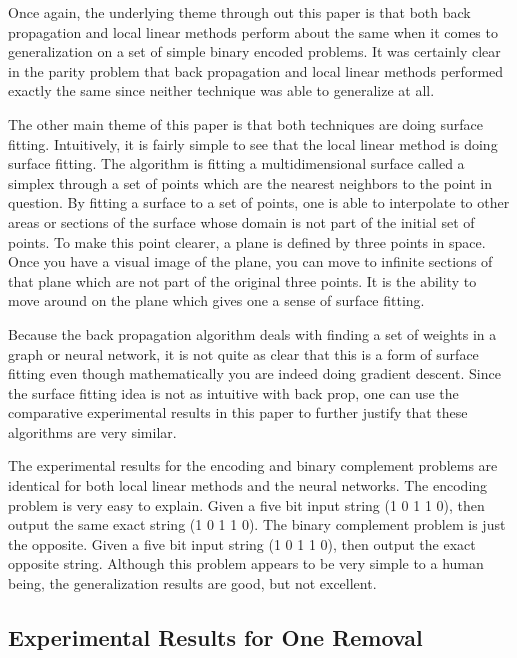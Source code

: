 	Once again, the underlying theme through out this paper is
that both back propagation and local linear methods perform about the
same when it comes to generalization on a set of simple binary encoded
problems.  It was certainly clear in the parity problem that back
propagation and local linear methods performed exactly the same since
neither technique was able to generalize at all.

	The other main theme of this paper is that both techniques are
doing surface fitting.  Intuitively, it is fairly simple to see that
the local linear method is doing surface fitting.  The algorithm is
fitting a multidimensional surface called a simplex through a set of
points which are the nearest neighbors to the point in question.  By
fitting a surface to a set of points, one is able to interpolate to
other areas or sections of the surface whose domain is not part of the
initial set of points.  To make this point clearer, a plane is defined
by three points in space.  Once you have a visual image of the plane,
you can move to infinite sections of that plane which are not part of
the original three points.  It is the ability to move around on the
plane which gives one a sense of surface fitting.

	Because the back propagation algorithm deals with finding a
set of weights in a graph or neural network, it is not quite as clear
that this is a form of surface fitting even though mathematically you
are indeed doing gradient descent.  Since the surface fitting idea is
not as intuitive with back prop, one can use the comparative
experimental results in this paper to further justify that these
algorithms are very similar.

	The experimental results for the encoding and binary
complement problems are identical for both local linear methods and
the neural networks.  The encoding problem is very easy to explain.
Given a five bit input string (1 0 1 1 0), then output the same exact
string (1 0 1 1 0).  The binary complement problem is just the
opposite.  Given a five bit input string (1 0 1 1 0), then output the
exact opposite string.  Although this problem appears to be very
simple to a human being, the generalization results are good, but
not excellent.

\subsection{Experimental Results for One Removal}

